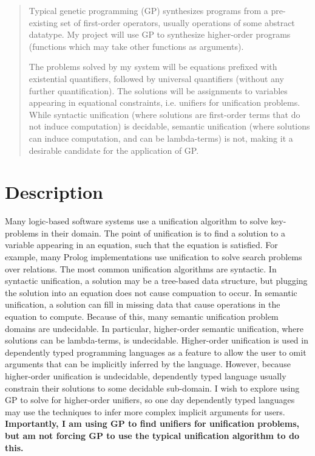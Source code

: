 \documentclass{article}
\begin{document}
\maketitle

\begin{abstract}
Typical genetic programming (GP) synthesizes programs from a pre-existing
set of first-order operators, usually operations of some abstract
datatype. My project will use GP to synthesize higher-order programs
(functions which may take other functions as arguments). 

The problems solved by my system will be equations prefixed with
existential quantifiers, followed by universal quantifiers (without any
further quantification). The solutions will be assignments to
variables appearing in equational constraints, i.e. unifiers for
unification problems. While syntactic unification (where solutions are
first-order terms that do not induce computation) is decidable,
semantic unification (where solutions can induce computation, and can
be lambda-terms) is not, making it a desirable candidate
for the application of GP.
\end{abstract}

\section{Description}
Many logic-based software systems use a unification algorithm to solve
key-problems in their domain. The point of unification is to find a
solution to a variable appearing in an equation, such that the
equation is satisfied.
For example, many Prolog implementations
use unification to solve search problems over relations. The most
common unification algorithms are syntactic. In syntactic unification,
a solution may be a tree-based data structure, but plugging the
solution into an equation does not cause compuation to occur. In
semantic unification, a solution can fill in missing data that cause
operations in the equation to compute. Because of this, many semantic
unification problem domains are undecidable. In particular,
higher-order semantic unification, where solutions can be
lambda-terms, is undecidable. Higher-order unification is used in
dependently typed programming languages as a feature to allow the user
to omit arguments that can be implicitly inferred by the language.
However, because higher-order unification is undecidable, dependently
typed language usually constrain their solutions to some decidable
sub-domain. I wish to explore using GP to solve for higher-order unifiers,
so one day dependently typed languages may use the techniques to infer
more complex implicit arguments for users. \textbf{Importantly, I am using GP
to find unifiers for unification problems, but am not forcing GP to
use the typical unification algorithm to do this.}
\end{document}
